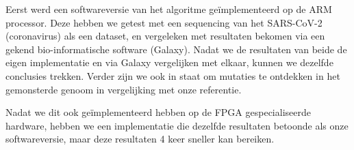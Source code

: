 Eerst werd een softwareversie van het algoritme ge\"implementeerd op de ARM processor. Deze hebben we getest met een sequencing van het SARS-CoV-2 (coronavirus) als een dataset, en vergeleken met resultaten bekomen via een gekend bio-informatische software (Galaxy). Nadat we de resultaten van beide de eigen implementatie en via Galaxy vergelijken met elkaar, kunnen we dezelfde conclusies trekken. Verder zijn we ook in staat om mutaties te ontdekken in het gemonsterde genoom in vergelijking met onze referentie.

Nadat we dit ook ge\"implementeerd hebben op de FPGA gespecialiseerde hardware, hebben we een implementatie die dezelfde resultaten betoonde als onze softwareversie, maar deze resultaten 4 keer sneller kan bereiken.